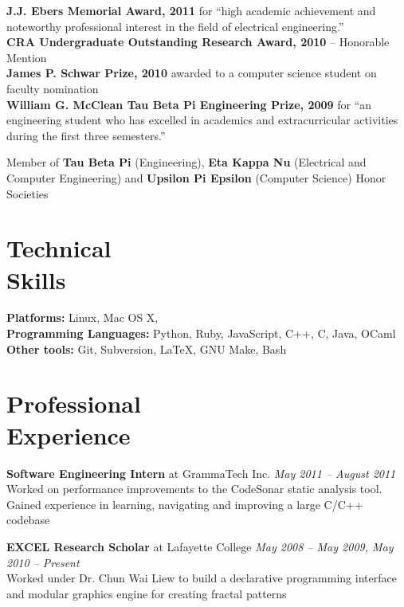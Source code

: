 \documentclass[margin,line]{resume}
\begin{document}
\begin{resume}
    {\bf J.J. Ebers Memorial Award, 2011} for ``high academic achievement and
    noteworthy professional interest in the field of electrical engineering.''\\
    {\bf CRA Undergraduate Outstanding Research Award, 2010} -- Honorable
    Mention \\
    {\bf James P. Schwar Prize, 2010} awarded to a computer science student on
    faculty nomination \\
    {\bf William G. McClean Tau Beta Pi Engineering Prize, 2009} for ``an
    engineering student who has excelled in academics and extracurricular
    activities during the first three semesters.''

    Member of {\bf Tau Beta Pi} (Engineering), {\bf Eta Kappa Nu} (Electrical
    and Computer Engineering) and {\bf Upsilon Pi Epsilon} (Computer Science)
    Honor Societies

    \section{Technical\\ Skills}
    {\bf Platforms:} Linux, Mac OS X,\\
    {\bf Programming Languages:} Python, Ruby, JavaScript, C++, C, Java, OCaml\\
    {\bf Other tools:} Git, Subversion, \LaTeX, GNU Make, Bash

    \section{Professional\\Experience}

    {\bf Software Engineering Intern} at GrammaTech Inc. \hfill
    {\sl May 2011 -- August 2011} \\
    Worked on performance improvements to the CodeSonar static analysis tool.
    Gained experience in learning, navigating and improving a large C/C++
    codebase

    {\bf EXCEL Research Scholar} at Lafayette College \hfill
    {\sl May 2008 -- May 2009, May 2010 -- Present}\\
    Worked under Dr. Chun Wai Liew to build a declarative programming interface
    and modular graphics engine for creating fractal patterns


\end{resume}
\end{document}
